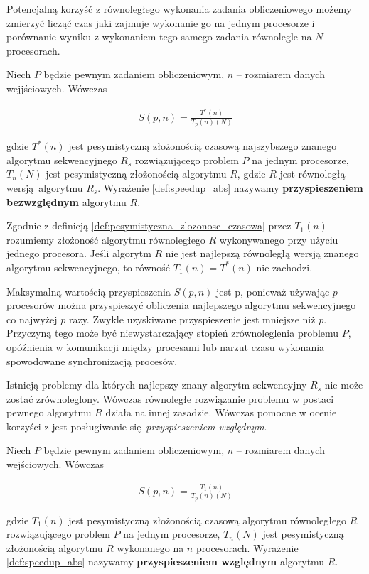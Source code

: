 Potencjalną korzyść z równoległego wykonania zadania obliczeniowego możemy zmierzyć licząć czas jaki zajmuje wykonanie go na jednym procesorze i porównanie wyniku z wykonaniem tego samego zadania równolegle na \(N\) procesorach. 

\begin{definicja}
Niech \(P\) będzie pewnym zadaniem obliczeniowym, \(n\) -- rozmiarem danych wejjściowych. Wówczas

\begin{align}\label{def:speedup_abs}
 S(p, n)=\frac{T^{*}(n)}{T_{p}(n)(N)}
\end{align}

gdzie \(T^{*}(n)\) jest pesymistyczną złożonością czasową najszybszego znanego algorytmu sekwencyjnego \(R_s\) rozwiązującego problem \(P\) na jednym procesorze, \(T_{n}(N)\) jest pesymistyczną złożonością algorytmu \(R\), gdzie \(R\) jest równoległą wersją algorytmu \(R_s\). Wyrażenie \ref{def:speedup_abs} nazywamy \textbf{przyspieszeniem bezwzględnym} algorytmu \(R\).
\end{definicja}


Zgodnie z definicją \ref{def:pesymistyczna_zlozonosc_czasowa} przez \(T_{1}(n)\) rozumiemy złożoność algorytmu równoległego \(R\) wykonywanego przy użyciu jednego procesora. Jeśli algorytm \(R\) nie jest najlepszą równoległą wersją znanego algorytmu sekwencyjnego, to równość \(T_{1}(n) = T^{*}(n)\) nie zachodzi.


Maksymalną wartością przyspieszenia \(S(p,n)\) jest p, ponieważ używając \(p\) procesorów można przyspieszyć obliczenia najlepszego algorytmu sekwencyjnego co najwyżej \(p\) razy. Zwykle uzyskiwane przyspieszenie jest mniejsze niż \(p\). Przyczyną tego może być niewystarczający stopień zrównoleglenia problemu \(P\), opóźnienia w komunikacji między procesami lub narzut czasu wykonania spowodowane synchronizacją procesów.


Istnieją problemy dla których najlepszy znany algorytm sekwencyjny \(R_s\) nie może zostać zrównoleglony. Wówczas równoległe rozwiązanie problemu w postaci pewnego algorytmu \(R\) działa na innej zasadzie. Wówczas pomocne w ocenie korzyści z jest posługiwanie się \emph{przyspieszeniem względnym}.

\begin{definicja}
Niech \(P\) będzie pewnym zadaniem obliczeniowym, \(n\) -- rozmiarem danych wejściowych. Wówczas

\begin{align}\label{def:speedup_rel}
 S(p, n)=\frac{T_{1}(n)}{T_{p}(n)(N)}
\end{align}

gdzie \(T_{1}(n)\) jest pesymistyczną złożonością czasową algorytmu równoległego \(R\) rozwiązującego problem \(P\) na jednym procesorze, \(T_{n}(N)\) jest pesymistyczną złożonością algorytmu \(R\) wykonanego na \(n\) procesorach. Wyrażenie \ref{def:speedup_abs} nazywamy \textbf{przyspieszeniem względnym} algorytmu \(R\).
\end{definicja}

